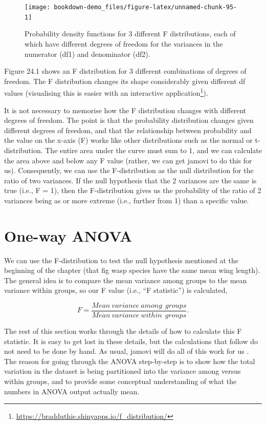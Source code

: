 \documentclass[
  openany]{scrbook}
\begin{document}
\begin{figure}
\texttt{[image: bookdown-demo\_files/figure-latex/unnamed-chunk-95-1]} \caption{Probability density functions for 3 different F distributions, each of which have different degrees of freedom for the variances in the numerator (df1) and denominator (df2).}\label{fig:unnamed-chunk-95}
\end{figure}

Figure 24.1 shows an F distribution for 3 different combinations of degrees of freedom.
The F distribution changes its shape considerably given different df values (visualising this is easier with an interactive application\footnote{\url{https://bradduthie.shinyapps.io/f_distribution/}}).

It is not necessary to memorise how the F distribution changes with different degrees of freedom.
The point is that the probability distribution changes given different degrees of freedom, and that the relationship between probability and the value on the x-axis (F) works like other distributions such as the normal or t-distribution.
The entire area under the curve must sum to 1, and we can calculate the area above and below any F value (rather, we can get jamovi to do this for us).
Consequently, we can use the F-distribution as the null distribution for the ratio of two variances.
If the null hypothesis that the 2 variances are the same is true (i.e., F = 1), then the F-distribution gives us the probability of the ratio of 2 variances being as or more extreme (i.e., further from 1) than a specific value.

\hypertarget{one-way-anova}{%
\section{One-way ANOVA}\label{one-way-anova}}

We can use the F-distribution to test the null hypothesis mentioned at the beginning of the chapter (that fig wasp species have the same mean wing length).
The general idea is to compare the mean variance among groups to the mean variance within groups, so our F value (i.e., ``F statistic'') is calculated,

\[F = \frac{Mean\:variance\:among\:\:groups}{Mean\:variance\:within\:\:groups}.\]

The rest of this section works through the details of how to calculate this F statistic.
It is easy to get lost in these details, but the calculations that follow do not need to be done by hand.
As usual, jamovi will do all of this work for us \citep{Jamovi2022}.
The reason for going through the ANOVA step-by-step is to show how the total variation in the dataset is being partitioned into the variance among versus within groups, and to provide some conceptual understanding of what the numbers in ANOVA output actually mean.
\end{document}
